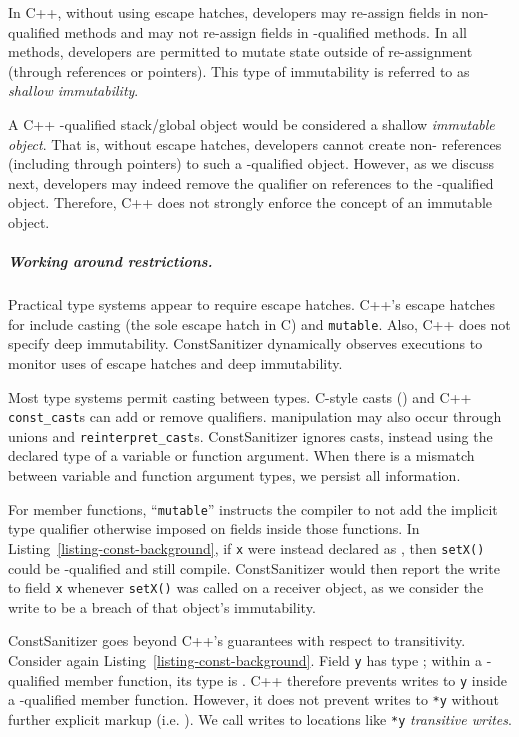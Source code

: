 In C++, without using \const{} escape hatches, developers may re-assign
fields in non-\const{} qualified methods and may not re-assign fields in
\const{}-qualified methods.
In all methods, developers are permitted to mutate state outside of
re-assignment (through references or pointers).
This type of immutability is referred to as \emph{shallow immutability}.

A C++ \const{}-qualified stack/global object would be considered a shallow
\emph{immutable object}.
That is, without escape hatches, developers cannot create non-\const{}
references (including through pointers) to such a \const{}-qualified object.
However, as we discuss next, developers may indeed remove the \const{} qualifier
on references to the \const{}-qualified object.
Therefore, C++ does not strongly enforce the concept of an immutable object.

\subparagraph*{Working around \const{} restrictions.}
Practical type systems appear to require escape hatches.
C++'s escape hatches for \const{} include casting (the sole
escape hatch in C) and \texttt{mutable}.
Also, C++ \const{} does not specify deep immutability.
ConstSanitizer dynamically observes executions to
monitor uses of escape hatches and deep immutability.

Most type systems permit casting between types.
C-style casts () and C++ \texttt{const\_cast}s can
add or remove \const{} qualifiers.
\const{} manipulation may also occur through unions and
\texttt{reinterpret\_cast}s.
ConstSanitizer ignores casts, instead using the declared type of
a variable or function argument.
When there is a mismatch between variable and function argument types, we
persist all \const{} information.

For \const{} member functions, ``\texttt{mutable}'' instructs the
compiler to not add the implicit \const{} type qualifier otherwise imposed on
fields inside those functions.
In Listing~\ref{listing-const-background}, if \texttt{x} were instead
declared as , then \texttt{setX()} could be
\const{}-qualified and still compile.
ConstSanitizer would then report the write to field \texttt{x} whenever
\texttt{setX()} was called on a \const{} receiver object, as we consider the
write to be a breach of that object's immutability.

ConstSanitizer goes beyond C++'s guarantees with respect to transitivity.
Consider again Listing~\ref{listing-const-background}.
Field \texttt{y} has type ; within a \const{}-qualified member
function, its type is .
C++ therefore prevents writes to \texttt{y} inside a \const{}-qualified member
function.
However, it does not prevent writes to \texttt{*y} without further explicit
markup (i.e. ).
We call writes to locations like \texttt{*y} \emph{transitive writes}.


